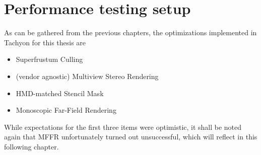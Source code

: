 
\chapter{Performance testing setup} \label{benchmark_setup}
As can be gathered from the previous chapters, the optimizations implemented in Tachyon for this thesis are 
\begin{itemize}
\item Superfrustum Culling
\item (vendor agnostic) Multiview Stereo Rendering
\item \gls{HMD}-matched Stencil Mask
\item Monoscopic Far-Field Rendering
\end{itemize}

While expectations for the first three items were optimistic, it shall be noted again that MFFR unfortunately turned out unsuccessful, which will reflect in this following chapter. 

